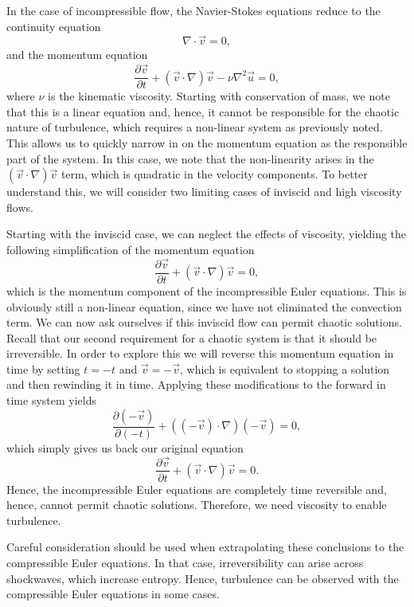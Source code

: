 In the case of incompressible flow, the Navier-Stokes equations reduce to the continuity equation
\begin{equation}
	\nabla \cdot \vec{v} = 0,
\end{equation}
and the momentum equation
\begin{equation}
	\frac{\partial \vec{v}}{\partial t} + \left(\vec{v} \cdot \nabla \right)\vec{v} - \nu \nabla^2 \vec{u} = 0,
\end{equation}
where $\nu$ is the kinematic viscosity. Starting with conservation of mass, we note that this is a linear equation and, hence, it cannot be responsible for the chaotic nature of turbulence, which requires a non-linear system as previously noted. This allows us to quickly narrow in on the momentum equation as the responsible part of the system. In this case, we note that the non-linearity arises in the $\left(\vec{v} \cdot \nabla \right)\vec{v}$ term, which is quadratic in the velocity components. To better understand this, we will consider two limiting cases of inviscid and high viscosity flows.

Starting with the inviscid case, we can neglect the effects of viscosity, yielding the following simplification of the momentum equation
\begin{equation}
	\frac{\partial \vec{v}}{\partial t} + \left(\vec{v} \cdot \nabla \right)\vec{v} = 0,
\end{equation}
which is the momentum component of the incompressible Euler equations. This is obviously still a non-linear equation, since we have not eliminated the convection term. We can now ask ourselves if this inviscid flow can permit chaotic solutions. Recall that our second requirement for a chaotic system is that it should be irreversible. In order to explore this we will reverse this momentum equation in time by setting $t=-t$ and $\vec{v} = -\vec{v}$, which is equivalent to stopping a solution and then rewinding it in time. Applying these modifications to the forward in time system yields
\begin{equation}
	\frac{\partial (-\vec{v})}{\partial (-t)} + \left((-\vec{v}) \cdot \nabla \right)(-\vec{v}) = 0,
\end{equation}
which simply gives us back our original equation
\begin{equation}
	\frac{\partial \vec{v}}{\partial t} + \left(\vec{v} \cdot \nabla \right)\vec{v} = 0.
\end{equation}
Hence, the incompressible Euler equations are completely time reversible and, hence, cannot permit chaotic solutions. Therefore, we need viscosity to enable turbulence.
\begin{remark}
Careful consideration should be used when extrapolating these conclusions to the compressible Euler equations. In that case, irreversibility can arise across shockwaves, which increase entropy. Hence, turbulence can be observed with the compressible Euler equations in some cases.
\end{remark}

